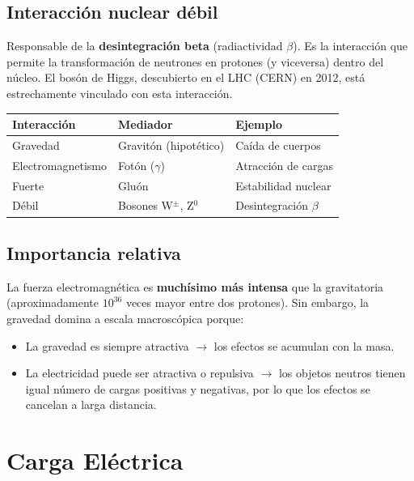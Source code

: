 \documentclass[12pt,a4paper]{article}
\begin{document}
\subsection{Interacción nuclear débil}

Responsable de la \textbf{desintegración beta} (radiactividad $\beta$). Es la interacción que permite la transformación de neutrones en protones (y viceversa) dentro del núcleo. El bosón de Higgs, descubierto en el LHC (CERN) en 2012, está estrechamente vinculado con esta interacción.

\begin{refbox}
\begin{tabular}{lll}
\toprule
\textbf{Interacción} & \textbf{Mediador} & \textbf{Ejemplo} \\
\midrule
Gravedad & Gravitón (hipotético) & Caída de cuerpos \\
Electromagnetismo & Fotón ($\gamma$) & Atracción de cargas \\
Fuerte & Gluón & Estabilidad nuclear \\
Débil & Bosones W$^\pm$, Z$^0$ & Desintegración $\beta$ \\
\bottomrule
\end{tabular}
\end{refbox}

\subsection{Importancia relativa}

La fuerza electromagnética es \textbf{muchísimo más intensa} que la gravitatoria (aproximadamente $10^{36}$ veces mayor entre dos protones). Sin embargo, la gravedad domina a escala macroscópica porque:
\begin{itemize}[nosep]
  \item La gravedad es siempre atractiva $\rightarrow$ los efectos se acumulan con la masa.
  \item La electricidad puede ser atractiva o repulsiva $\rightarrow$ los objetos neutros tienen igual número de cargas positivas y negativas, por lo que los efectos se cancelan a larga distancia.
\end{itemize}

\section{Carga Eléctrica}
\end{document}
